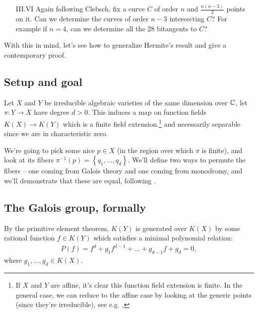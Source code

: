 \documentclass[11pt]{amsart}
\begin{document}
\begin{itemize}
    \item[III.VI] Again following Clebsch, fix a curve $C$ of order $n$ and $\frac{n(n-3)}{2}$ points on it. Can we determine the curves of order $n-3$ intersecting $C$? For example if $n=4$, can we determine all the 28 bitangents to $C$?
\end{itemize}

With this in mind, let's see how to generalize Hermite's result and give a contemporary proof.

\subsection{Setup and goal}

Let $X$ and $Y$ be irreducible algebraic varieties of the same dimension over $\mathbb{C}$, let $\pi \colon Y \to X$ have degree $d>0$. This induces a map on function fields $K(X) \to K(Y)$ which is a finite field extension.\footnote{If $X$ and $Y$ are affine, it's clear this function field extension is finite. In the general case, we can reduce to the affine case by looking at the generic points (since they're irreducible), see e.g. \cite[02NW]{Stacks}.} and necessarily separable since we are in characteristic zero.

We're going to pick some nice $p \in X$ (in the region over which $\pi$ is finite), and look at its fibers $\pi^{-1}(p) = \left\{ q_1, \ldots, q_d \right\}$. We'll define two ways to permute the fibers -- one coming from Galois theory and one coming from monodromy, and we'll demonstrate that these are equal, following \cite[\S1]{Harris-Galois}.

\subsection{The Galois group, formally}

By the primitive element theorem, $K(Y)$ is generated over $K(X)$ by some rational function $f \in K(Y)$ which satisfies a minimal polynomial relation:
\begin{align*}
    P(f) = f^d + g_1 f^{d-1} + \ldots + g_{d-1}f + g_d = 0,
\end{align*}
where $g_1, \ldots, g_d\in K(X)$.
\end{document}

